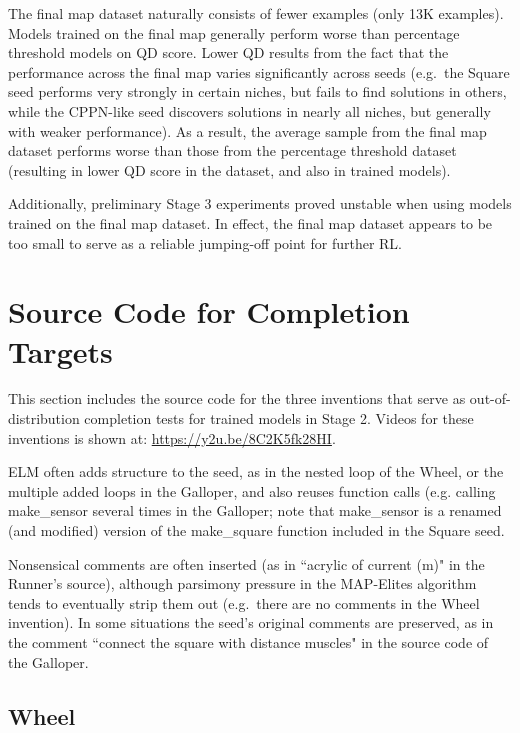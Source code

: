 \documentclass{article}
\begin{document}
The final map dataset naturally consists of fewer examples (only 13K examples).
Models trained on the final map generally perform worse than
percentage threshold models on QD score. Lower QD results from the fact that
the performance across the final map varies significantly across seeds (e.g.\ the Square seed performs very strongly
in certain niches, but fails to find solutions in others, while the CPPN-like seed discovers solutions in nearly all
niches, but generally with weaker performance). As a result, the average sample from the final map dataset performs
worse than those from the percentage threshold dataset (resulting in lower QD score in the dataset, and also in trained
models).

Additionally, preliminary Stage 3 experiments
proved unstable when using models trained on the final map dataset. In effect, the final map
dataset appears to be too small to serve as a reliable jumping-off point for
further RL. 

\section{Source Code for Completion Targets}
\label{appendix:completion_targets}

This section includes the source code for the three inventions that serve as out-of-distribution completion tests for
trained models in Stage 2. Videos for these inventions is shown at: \url{https://y2u.be/8C2K5fk28HI}.

ELM often
adds structure to the seed, as in the nested loop of the Wheel, or the multiple added loops in the Galloper, and also
reuses function calls (e.g. calling \textrm{make\_sensor} several times in the Galloper; note that \textrm{make\_sensor} is a renamed (and modified) version
of the \textrm{make\_square} function included in the Square seed.

Nonsensical comments are often inserted (as in ``acrylic of current (m)" in the Runner's source), although
 parsimony pressure in the MAP-Elites algorithm tends to eventually
strip them out (e.g.\ there are no comments in the Wheel invention). In some situations the seed's original comments
are preserved, as in the comment ``connect the square with distance muscles" in the source code of the Galloper. 

\subsection{Wheel}
\end{document}
